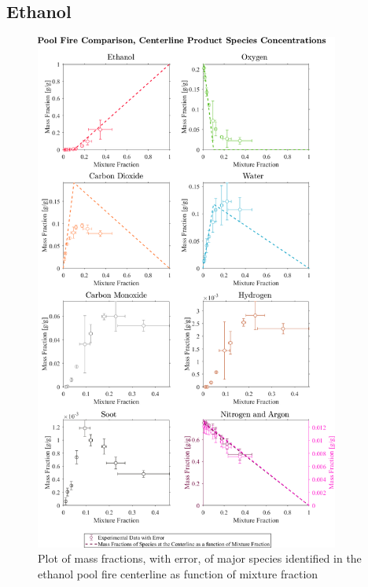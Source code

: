 \documentclass[12pt]{article}
\begin{document}
\subsection{Ethanol}
\label{ssec:Ethanol_ALL_Mix_Frac}
\begin{figure}[h!]
	\centering
\includegraphics[width=10.0cm,keepaspectratio]{Ethanol_Mixture_Fraction_Major_Plot.png}
	\caption[Plot of mass fractions, with error, of major species identified in the ethanol pool fire centerline as function of mixture fraction]{Plot of mass fractions, with error, of major species identified in the ethanol pool fire centerline as function of mixture fraction}
	\label{fig:Ethanol_MIX_Frac_Major}
\end{figure}

\pagebreak
\end{document}
